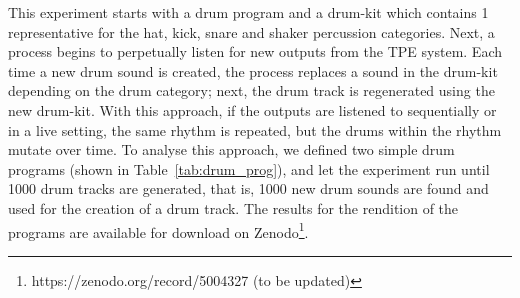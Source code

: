 \documentclass[\main/thesis.tex]{subfiles}
\begin{document}
This experiment starts with a drum program and a drum-kit which contains 1 representative for the hat, kick, snare and shaker percussion categories. Next, a process begins to perpetually listen for new outputs from the TPE system. Each time a new drum sound is created, the process replaces a sound in the drum-kit depending on the drum category; next, the drum track is regenerated using the new drum-kit. With this approach, if the outputs are listened to sequentially or in a live setting, the same rhythm is repeated, but the drums within the rhythm mutate over time. To analyse this approach, we defined two simple drum programs (shown in Table~\ref{tab:drum_prog}), and let the experiment run until 1000 drum tracks are generated, that is, 1000 new drum sounds are found and used for the creation of a drum track. The results for the rendition of the programs are available for download on Zenodo\footnote{https://zenodo.org/record/5004327  (to be updated)}. 
\begin{table}[tbp]
\caption{\label{tab:drum_prog} Parameters for each drum program.\enquote{.} indicates no action}
\end{table}
\end{document}
